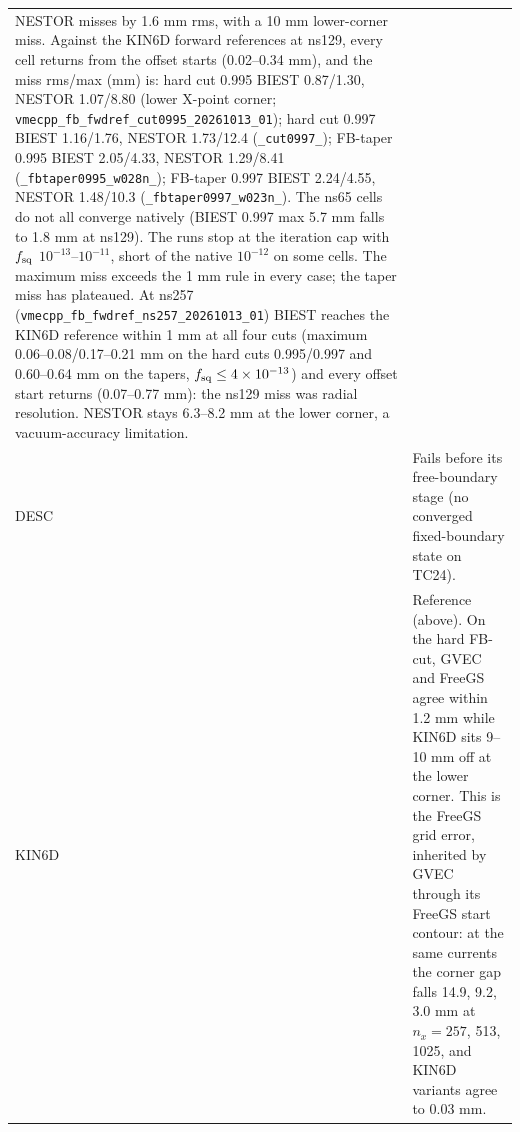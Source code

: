 \begin{center}
\begin{tabular}{p{18mm}p{136mm}}
NESTOR misses by 1.6 mm rms, with a 10 mm lower-corner miss. Against the KIN6D forward
references at ns129, every cell returns from the offset starts (0.02--0.34 mm), and the
miss rms/max (mm) is: hard cut 0.995 BIEST 0.87/1.30, NESTOR 1.07/8.80 (lower X-point
corner; \texttt{vmecpp\_fb\_fwdref\_cut0995\_20261013\_01}); hard cut 0.997 BIEST 1.16/1.76,
NESTOR 1.73/12.4 (\texttt{\_cut0997\_}); FB-taper 0.995 BIEST 2.05/4.33, NESTOR 1.29/8.41
(\texttt{\_fbtaper0995\_w028n\_}); FB-taper 0.997 BIEST 2.24/4.55, NESTOR 1.48/10.3
(\texttt{\_fbtaper0997\_w023n\_}). The ns65 cells do not all converge natively (BIEST 0.997 max
5.7 mm falls to 1.8 mm at ns129). The runs stop at the iteration cap with $f_{\rm sq}$
$10^{-13}$--$10^{-11}$, short of the native $10^{-12}$ on some cells. The maximum miss exceeds the 1 mm
rule in every case; the taper miss has plateaued. At ns257 (\texttt{vmecpp\_fb\_fwdref\_ns257\_20261013\_01}) BIEST reaches the KIN6D
reference within 1 mm at all four cuts (maximum 0.06--0.08/0.17--0.21 mm on the hard cuts
0.995/0.997 and 0.60--0.64 mm on the tapers, $f_{\rm sq}\le4\times10^{-13}$) and every offset
start returns (0.07--0.77 mm): the ns129 miss was radial resolution. NESTOR stays 6.3--8.2 mm
at the lower corner, a vacuum-accuracy limitation. \\
DESC & Fails before its free-boundary stage (no converged fixed-boundary state on TC24). \\
KIN6D & Reference (above). On the hard FB-cut, GVEC and FreeGS agree within 1.2 mm while
KIN6D sits 9--10 mm off at the lower corner. This is the FreeGS grid error, inherited by GVEC
through its FreeGS start contour: at the same currents the corner gap falls 14.9, 9.2,
3.0 mm at $n_x=257$, 513, 1025, and KIN6D variants agree to 0.03 mm. \\
\bottomrule
\end{tabular}
\end{center}

